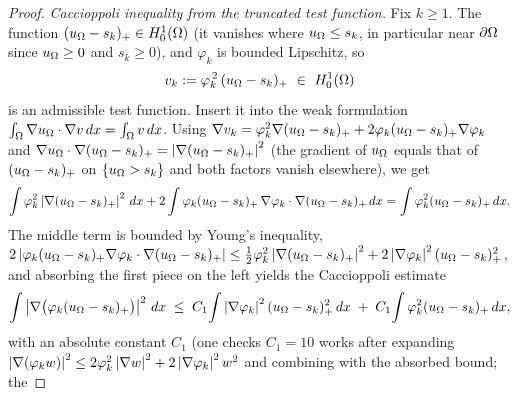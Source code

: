 \begin{proof}
\smallskip
\emph{Caccioppoli inequality from the truncated test function.}
Fix $k\ge1$. The function $(u_\Omega-s_k)_+\in H^1_0(\Omega)$ (it vanishes
where $u_\Omega\le s_k$, in particular near $\partial\Omega$ since $u_\Omega\ge0$
and $s_k\ge0$), and $\varphi_k$ is bounded Lipschitz, so
\[
   v_k:=\varphi_k^{\,2}\,(u_\Om-s_k)_+\ \in\ H^1_0(\Om)
\]
is an admissible test function.
Insert it into the weak formulation
$\int_\Omega\nabla u_\Omega\cdot\nabla v\,dx=\int_\Omega v\,dx$. Using
$\nabla v_k=\varphi_k^2\nabla(u_\Omega-s_k)_+
+2\varphi_k(u_\Omega-s_k)_+\nabla\varphi_k$ and
$\nabla u_\Omega\cdot\nabla(u_\Omega-s_k)_+=\left|\nabla(u_\Omega-s_k)_+\right|^2$ (the
gradient of $u_\Omega$ equals that of $(u_\Omega-s_k)_+$ on $\{u_\Omega>s_k\}$ and
both factors vanish elsewhere), we get
\[
   \int\varphi_k^2\left|\nabla(u_\Omega-s_k)_+\right|^2\,dx
   +2\int\varphi_k(u_\Omega-s_k)_+\,\nabla\varphi_k\cdot\nabla(u_\Omega-s_k)_+\,dx
   =\int\varphi_k^2(u_\Omega-s_k)_+\,dx .
\]
The middle term is bounded by Young's inequality,
$2\left|\varphi_k(u_\Omega-s_k)_+\nabla\varphi_k\cdot\nabla(u_\Omega-s_k)_+\right|
\le\tfrac12\varphi_k^2\left|\nabla(u_\Omega-s_k)_+\right|^2
+2\left|\nabla\varphi_k\right|^2(u_\Omega-s_k)_+^2$,
and absorbing the first piece on the left yields the Caccioppoli
estimate
\begin{equation}\label{eq:caccioppoli}
   \int\left|\nabla\bigl(\varphi_k(u_\Omega-s_k)_+\bigr)\right|^2\,dx
   \;\le\;C_1\!\int\left|\nabla\varphi_k\right|^2(u_\Omega-s_k)_+^2\,dx
        \;+\;C_1\!\int\varphi_k^2(u_\Omega-s_k)_+\,dx,
\end{equation}
with an absolute constant $C_1$ (one checks $C_1=10$ works after expanding
$\left|\nabla(\varphi_k w)\right|^2\le2\varphi_k^2\left|\nabla w\right|^2
+2\left|\nabla\varphi_k\right|^2 w^2$ and combining with the absorbed bound; the

\end{proof}
